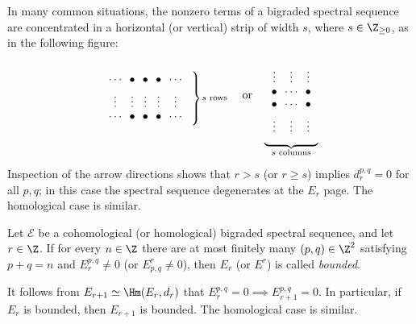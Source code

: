 \begin{example}\label{eg:SS-finite-width}
	In many common situations, the nonzero terms of a bigraded spectral sequence
	are concentrated in a horizontal (or vertical) strip of width $s$, where
	$s\in\Z_{\geq0}$, as in the following figure:
	\[\begin{tikzpicture}[baseline]
		\matrix (M) [matrix of math nodes, right delimiter=\}] {
			\cdots & \bullet & \bullet & \bullet & \cdots \\
			\vdots & \vdots & \vdots & \vdots & \vdots \\
			\cdots & \bullet & \bullet & \bullet & \cdots \\
		};
		\node[right=2em] at (M-2-5) {\scriptsize \text{$s$ rows}};
	\end{tikzpicture} \quad \text{or} \quad \begin{tikzpicture}[baseline]
		\matrix (M) [matrix of math nodes, below delimiter=\}] {
			\vdots & \vdots & \vdots \\
			\bullet & \cdots & \bullet \\
			\bullet & \cdots & \bullet \\
			\vdots & \vdots & \vdots \\
		};
		\node[below=2em] at (M-4-2) {\scriptsize \text{$s$ columns}};
	\end{tikzpicture}\]
	Inspection of the arrow directions shows that $r>s$ (or $r\geq s$)
	implies $d_r^{p,q}=0$ for all $p,q$; in this case the spectral sequence
	degenerates at the $E_r$ page. The homological case is similar.
\end{example}

\begin{definition}\label{def:bdd-ss}
	Let $\mathscr{E}$ be a cohomological (or homological) bigraded spectral
	sequence, and let $r\in\Z$. If for every $n\in\Z$ there are at most
	finitely many $(p,q)\in\Z^2$ satisfying $p+q=n$ and
	$E_r^{p,q}\neq0$ (or $E^r_{p,q}\neq0$), then $E_r$ (or $E^r$) is
	called \emph{bounded}.
\end{definition}

It follows from $E_{r+1}\simeq\Hm(E_r,d_r)$ that
$E_r^{p,q}=0\implies E_{r+1}^{p,q}=0$. In particular, if $E_r$ is bounded,
then $E_{r+1}$ is bounded. The homological case is similar.

